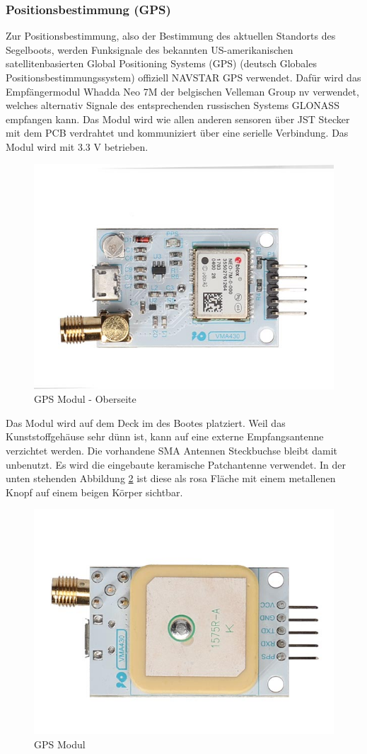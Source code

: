 \subsubsection{Positionsbestimmung (GPS)}
Zur Positionsbestimmung, also der Bestimmung des aktuellen Standorts des Segelboots, werden Funksignale des bekannten US-amerikanischen satellitenbasierten Global Positioning Systems (GPS) (deutsch Globales Positionsbestimmungssystem) offiziell NAVSTAR GPS verwendet. Dafür wird das Empfängermodul Whadda Neo 7M der belgischen Velleman Group nv verwendet, welches alternativ Signale des entsprechenden russischen Systems GLONASS empfangen kann.
Das Modul wird wie allen anderen sensoren über JST Stecker mit dem PCB verdrahtet und kommuniziert über eine serielle Verbindung. Das Modul wird mit 3.3 V betrieben.
\begin{figure}[H]
    \centering
    \includegraphics[width=0.75\linewidth]{vma430_front-1.jpg}
    \caption{GPS Modul - Oberseite}
    \label{fig:enter-label}
\end{figure}
Das Modul wird auf dem Deck im des Bootes platziert. Weil das Kunststoffgehäuse sehr dünn ist, kann auf eine externe Empfangsantenne verzichtet werden. Die vorhandene SMA Antennen Steckbuchse bleibt damit unbenutzt. Es wird die eingebaute keramische Patchantenne verwendet. In der unten stehenden Abbildung \ref{fig:GPS} ist diese als rosa Fläche mit einem metallenen Knopf auf einem beigen Körper sichtbar.
\begin{figure}[H]
    \centering
    \includegraphics[width=0.5\linewidth]{vma430_back-1.jpg}
    \caption{GPS Modul}
    \label{fig:GPS}
\end{figure}

